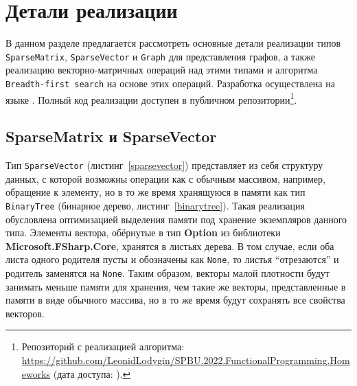 
\section{Детали реализации}
В данном разделе предлагается рассмотреть основные детали реализации типов \texttt{SparseMatrix}, \texttt{SparseVector} и \texttt{Graph} для представления графов, а также реализацию векторно-матричных операций над этими типами и алгоритма \texttt{Breadth-first search} на основе этих операций. Разработка осуществлена на языке \fsharp. Полный код реализации доступен в публичном репозитории\footnote{Репозиторий с реализацией алгоритма: \url{https://github.com/LeonidLodygin/SPBU.2022.FunctionalProgramming.Homeworks} (дата доступа:   ).}.

\subsection{SparseMatrix и SparseVector}
Тип \texttt{SparseVector} (листинг~\ref{sparsevector}) представляет из себя структуру данных, с которой возможны операции как с обычным массивом, например, обращение к элементу, но в то же время хранящуюся в памяти как тип \texttt{BinaryTree} (бинарное дерево, листинг~\ref{binarytree}). Такая реализация обусловлена оптимизацией выделения памяти под хранение экземпляров данного типа. Элементы вектора, обёрнутые в тип \textbf{Option} из библиотеки \textbf{Microsoft.FSharp.Core}, хранятся в листьях дерева. В том случае, если оба листа одного родителя пусты и обозначены как \texttt{None}, то листья \enquote{отрезаются} и родитель заменятся на \texttt{None}. Таким образом, векторы малой плотности будут занимать меньше памяти для хранения, чем такие же векторы, представленные в памяти в виде обычного массива, но в то же время будут сохранять все свойства векторов.


